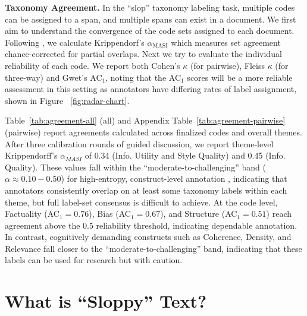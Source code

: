 \documentclass{article} %
\begin{document}
\textbf{Taxonomy Agreement.} In the ``slop'' taxonomy labeling task, multiple codes can be assigned to a span, and multiple spans can exist in a document. 
We first aim to understand the convergence of the code sets assigned to each document. 
Following \citet{Marchal2022EstablishingAQ}, we calculate Krippendorf's $\alpha_{\text{MASI}}$ which measures set agreement chance‑corrected for partial overlaps. 
Next we try to evaluate the individual reliability of each code. 
We report both Cohen's $\kappa$ (for pairwise), Fleiss  $\kappa$ (for three-way) and Gwet's AC$_1$, noting that the AC$_1$ scores will be a more reliable assessment in this setting as annotators have differing rates of label assignment, shown in Figure ~\ref{fig:radar-chart}. 

Table~\ref{tab:agreement-all} (all) and Appendix Table~\ref{tab:agreement-pairwise} (pairwise) report agreements calculated across finalized codes and overall themes. 
After three calibration rounds of guided discussion, we report theme‐level Krippendorff’s $\alpha_{MASI}$ of 0.34 (Info. Utility and Style Quality) and 0.45 (Info. Quality). These values fall within the ``moderate-to-challenging'' band ($\alpha \approx 0.10 - 0.50$) for high-entropy, construct-level annotation \citep{Marchal2022EstablishingAQ}, indicating that annotators consistently overlap on at least some taxonomy labels within each theme, but full label-set consensus is difficult to achieve. 
At the code level, Factuality (AC$_1 = 0.76$), Bias (AC$_1 = 0.67$), and Structure (AC$_1 = 0.51$) reach  agreement above the 0.5 reliability threshold, indicating dependable annotation. In contrast, cognitively demanding constructs such as Coherence, Density, and Relevance fall closer to the ``moderate-to-challenging'' band, indicating that these labels can be used for research but with caution.


\section{What is ``Sloppy'' Text?}
\label{sec:results}
\end{document}

